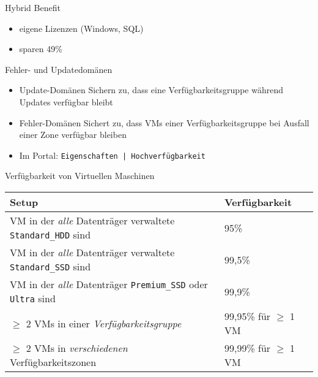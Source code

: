 
\begin{flashcard}[Definition]{Hybrid Benefit}
    \begin{itemize}
        \item eigene Lizenzen (Windows, SQL)
        \item sparen 49\%
    \end{itemize}
\end{flashcard}


\begin{flashcard}[Definition]{Fehler- und Updatedomänen}
    \begin{itemize}
        \item Update-Domänen\newline
            Sichern zu, dass eine Verfügbarkeitsgruppe während Updates verfügbar bleibt
        \item Fehler-Domänen\newline
            Sichert zu, dass VMs einer Verfügbarkeitsgruppe bei Ausfall einer Zone verfügbar bleiben
        \item Im Portal:\newline
            \texttt{Eigenschaften | Hochverfügbarkeit}
    \end{itemize}
\end{flashcard}

\begin{flashcard}[Definition]{Verfügbarkeit von Virtuellen Maschinen}
    \begin{tabular}{l|l}
        Setup       & Verfügbarkeit \\
        \hline
        VM in der \emph{alle} Datenträger verwaltete \texttt{Standard\_HDD} sind & 95\% \\
        VM in der \emph{alle} Datenträger verwaltete \texttt{Standard\_SSD} sind & 99,5\% \\
        VM in der \emph{alle} Datenträger \texttt{Premium\_SSD} oder \texttt{Ultra}
        sind & 99,9\% \\
        $\geq$ 2 VMs in einer \emph{Verfügbarkeitsgruppe} & 99,95\% für $\geq$ 1 VM  \\
        $\geq$ 2 VMs in \emph{verschiedenen} Verfügbarkeitszonen & 99,99\% für $\geq$ 1 VM
    \end{tabular}
\end{flashcard}

